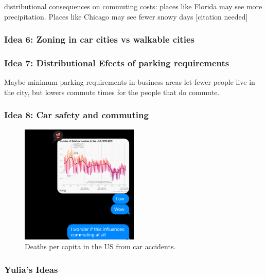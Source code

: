 \documentclass{article}
\begin{document}
distributional consequences on commuting costs:
places like Florida may see more precipitation. Places like Chicago may see fewer snowy days [citation needed]
\subsubsection{Idea 6: Zoning in car cities vs walkable cities}

\subsubsection{Idea 7: Distributional Efects of parking requirements}
Maybe minimum parking requirements in business areas let fewer people live in the city, but lowers commute times for the people that do commute.
\subsubsection{Idea 8: Car safety and commuting}
\begin{figure}
    \centering
    \includegraphics[width=0.5\textwidth]{img/cardeaths.jpeg}
    \caption{Deaths per capita in the US from car accidents.}
    \label{fig:car_deaths}
\end{figure}


\subsubsection{Yulia's Ideas}
\end{document}
